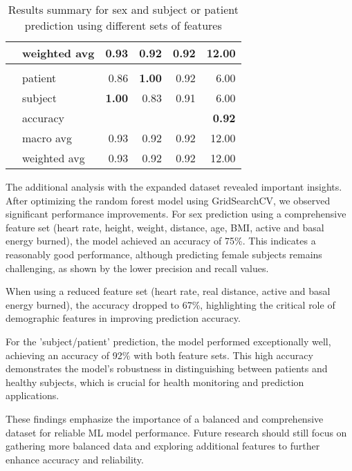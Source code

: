 \begin{table}[ht]
\begin{adjustbox}{max width=\textwidth}
\begin{tabular}{llrrrr}
        & weighted avg & 0.93 & 0.92 & 0.92 & 12.00 \\
        \midrule
        &  & & & & \\
        & patient & 0.86 & \textbf{1.00} & 0.92 & 6.00 \\
        & subject & \textbf{1.00} & 0.83 & 0.91 & 6.00 \\
        & accuracy &  &  &  & \textbf{0.92} \\
        & macro avg & 0.93 & 0.92 & 0.92 & 12.00 \\
        & weighted avg & 0.93 & 0.92 & 0.92 & 12.00 \\
        \bottomrule
    \end{tabular}
    \end{adjustbox}
    \caption{Results summary for sex and subject or patient prediction using different sets of features}
    \label{table:allDiscussion}
\end{table}
\FloatBarrier

The additional analysis with the expanded dataset revealed important insights. After optimizing the random forest model using GridSearchCV, we observed significant performance improvements. For sex prediction using a comprehensive feature set (heart rate, height, weight, distance, age, BMI, active and basal energy burned), the model achieved an accuracy of 75\%. This indicates a reasonably good performance, although predicting female subjects remains challenging, as shown by the lower precision and recall values.

When using a reduced feature set (heart rate, real distance, active and basal energy burned), the accuracy dropped to 67\%, highlighting the critical role of demographic features in improving prediction accuracy.

For the 'subject/patient' prediction, the model performed exceptionally well, achieving an accuracy of 92\% with both feature sets. This high accuracy demonstrates the model's robustness in distinguishing between patients and healthy subjects, which is crucial for health monitoring and prediction applications.

These findings emphasize the importance of a balanced and comprehensive dataset for reliable ML model performance. Future research should still focus on gathering more balanced data and exploring additional features to further enhance accuracy and reliability.

